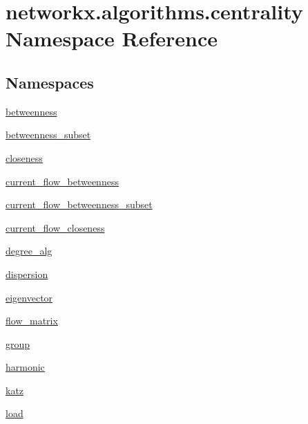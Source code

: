 \hypertarget{namespacenetworkx_1_1algorithms_1_1centrality}{}\section{networkx.\+algorithms.\+centrality Namespace Reference}
\label{namespacenetworkx_1_1algorithms_1_1centrality}
\subsection*{Namespaces}
\begin{DoxyCompactItemize}
\item 
 \hyperlink{namespacenetworkx_1_1algorithms_1_1centrality_1_1betweenness}{betweenness}
\item 
 \hyperlink{namespacenetworkx_1_1algorithms_1_1centrality_1_1betweenness__subset}{betweenness\+\_\+subset}
\item 
 \hyperlink{namespacenetworkx_1_1algorithms_1_1centrality_1_1closeness}{closeness}
\item 
 \hyperlink{namespacenetworkx_1_1algorithms_1_1centrality_1_1current__flow__betweenness}{current\+\_\+flow\+\_\+betweenness}
\item 
 \hyperlink{namespacenetworkx_1_1algorithms_1_1centrality_1_1current__flow__betweenness__subset}{current\+\_\+flow\+\_\+betweenness\+\_\+subset}
\item 
 \hyperlink{namespacenetworkx_1_1algorithms_1_1centrality_1_1current__flow__closeness}{current\+\_\+flow\+\_\+closeness}
\item 
 \hyperlink{namespacenetworkx_1_1algorithms_1_1centrality_1_1degree__alg}{degree\+\_\+alg}
\item 
 \hyperlink{namespacenetworkx_1_1algorithms_1_1centrality_1_1dispersion}{dispersion}
\item 
 \hyperlink{namespacenetworkx_1_1algorithms_1_1centrality_1_1eigenvector}{eigenvector}
\item 
 \hyperlink{namespacenetworkx_1_1algorithms_1_1centrality_1_1flow__matrix}{flow\+\_\+matrix}
\item 
 \hyperlink{namespacenetworkx_1_1algorithms_1_1centrality_1_1group}{group}
\item 
 \hyperlink{namespacenetworkx_1_1algorithms_1_1centrality_1_1harmonic}{harmonic}
\item 
 \hyperlink{namespacenetworkx_1_1algorithms_1_1centrality_1_1katz}{katz}
\item 
 \hyperlink{namespacenetworkx_1_1algorithms_1_1centrality_1_1load}{load}

\end{DoxyCompactItemize}
